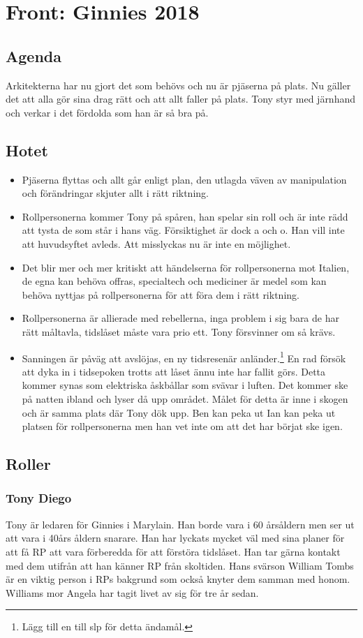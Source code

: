 \documentclass[a5paper,10pt]{report}
\begin{document}
\section{Front: Ginnies 2018}
\subsection{Agenda}
Arkitekterna har nu gjort det som behövs och nu är pjäserna på plats. Nu gäller det att alla gör sina drag rätt och att allt faller på plats. Tony styr med järnhand och verkar i det fördolda som han är så bra på.
\subsection{Hotet}
\begin{itemize}
  \item[Låg] Pjäserna flyttas och allt går enligt plan, den utlagda väven av manipulation och förändringar skjuter allt i rätt riktning.
  \item[1:a växeln] Rollpersonerna kommer Tony på spåren, han spelar sin roll och är inte rädd att tysta de som står i hans väg. Försiktighet är dock a och o. Han vill inte att huvudsyftet avleds. Att misslyckas nu är inte en möjlighet.
  \item[2:a växeln] Det blir mer och mer kritiskt att händelserna för rollpersonerna mot Italien, de egna kan behöva offras, specialtech och mediciner är medel som kan behöva nyttjas på rollpersonerna för att föra dem i rätt riktning.
  \item[3:e växeln] Rollpersonerna är allierade med rebellerna, inga problem i sig bara de har rätt måltavla, tidslåset måste vara prio ett. Tony försvinner om så krävs.
  \item[Overdrive] Sanningen är påväg att avslöjas, en ny tidsresenär anländer.\footnote{Lägg till en till slp för detta ändamål.} En rad försök att dyka in i tidsepoken trotts att låset ännu inte har fallit görs. Detta kommer synas som elektriska åskbållar som svävar i luften. Det kommer ske på natten ibland och lyser då upp området. Målet för detta är inne i skogen och är samma plats där Tony dök upp. Ben kan peka ut Ian kan peka ut platsen för rollpersonerna men han vet inte om att det har börjat ske igen.
\end{itemize}
\subsection{Roller}
\subsubsection{Tony Diego}
Tony är ledaren för Ginnies i Marylain. Han borde vara i 60 årsåldern men ser ut att vara i 40års åldern snarare. Han har lyckats mycket väl med sina planer för att få RP att vara förberedda för att förstöra tidslåset. Han tar gärna kontakt med dem utifrån att han känner RP från skoltiden. Hans svärson William Tombs är en viktig person i RPs bakgrund som också knyter dem samman med honom. Williams mor Angela har tagit livet av sig för tre år sedan.
\end{document}
